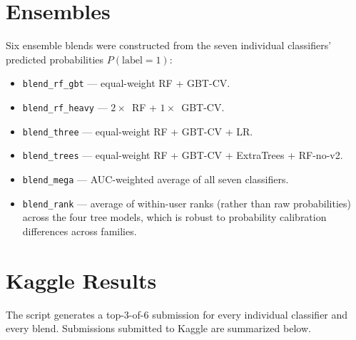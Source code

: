 \documentclass[12pt]{article}
\begin{document}
	\section{Ensembles}\label{sec:ensembles}

	Six ensemble blends were constructed from the seven individual classifiers' predicted probabilities $P(\text{label}=1)$:

	\begin{itemize}
		\item \texttt{blend\_rf\_gbt} --- equal-weight RF + GBT-CV.
		\item \texttt{blend\_rf\_heavy} --- $2\times$~RF + $1\times$~GBT-CV.
		\item \texttt{blend\_three} --- equal-weight RF + GBT-CV + LR.
		\item \texttt{blend\_trees} --- equal-weight RF + GBT-CV + ExtraTrees + RF-no-v2.
		\item \texttt{blend\_mega} --- AUC-weighted average of all seven classifiers.
		\item \texttt{blend\_rank} --- average of within-user ranks (rather than raw probabilities) across the four tree models, which is robust to probability calibration differences across families.
	\end{itemize}

	\newpage
	\section{Kaggle Results}\label{sec:kaggle}

	The script generates a top-3-of-6 submission for every individual classifier and every blend. Submissions submitted to Kaggle are summarized below.
\end{document}
